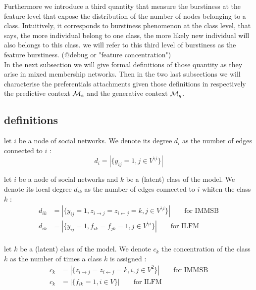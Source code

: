 Furthermore we introduce a third quantity that measure the burstiness at the feature level that expose the distribution of the number of nodes belonging to a class. Intuitively, it corresponds to burstiness phenomenon at the class level, that says, the more individual belong to one class, the more likely new individual will also belongs to this class. we will refer to this third level of burstiness as the {\large feature burstiness}. (@debug or "feature concentration") ~\\


In the next subsection we will give formal definitions of those quantity as they arise in mixed membership networks. Then in the two last subsections we will characterise the preferentials attachments given those definitions in respectively the predictive context $\mathcal{M}_e$ and the generative context $\mathcal{M}_g$.

\subsection{definitions}
\label{sec:definitions}

\begin{definition}
    let $i$ be a node of social networks. We denote its degree $d_i$ as the number of edges connected to $i$ : 
    \begin{equation}
        d_i = |\{y_{ij}=1, j \in V^{\setminus i}\}|
    \end{equation}
\end{definition}

\begin{definition}
    let $i$ be a node of social networks and $k$ be a (latent) class of the model. We denote its local degree $d_{ik}$ as the number of edges connected to $i$ whiten the class $k$ : 
    \begin{align}
        d_{ik} &= |\{y_{ij}=1, z_{i\rightarrow j}=z_{i\leftarrow j}=k,  j \in V^{\setminus i}\}| \qquad \textrm{for IMMSB} \\
        d_{ik} &= |\{y_{ij}=1, f_{ik}=f_{jk}=1,  j \in V^{\setminus i}\}| \qquad \textrm{for ILFM} \\
    \end{align}
\end{definition}

\begin{definition}
    let $k$ be a (latent) class of the model. We denote $c_k$ the concentration of the class $k$ as the number of times a class $k$ is assigned : 
    \begin{align}
        c_{k} &= |\{ z_{i\rightarrow j}=z_{i\leftarrow j}=k,  i, j \in V^2\}| \qquad \textrm{for IMMSB} \\
        c_{k} &= |\{ f_{ik}=1,  i \in V\}| \qquad \textrm{for ILFM} \\
    \end{align}
\end{definition}


